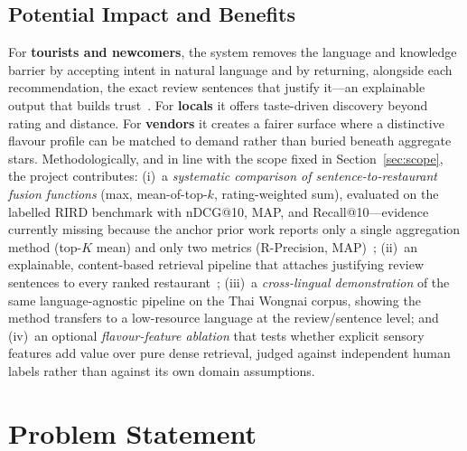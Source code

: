 \documentclass[10pt,twocolumn]{article}
\begin{document}
\subsection{Potential Impact and Benefits}
For \textbf{tourists and newcomers}, the system removes the language and knowledge
barrier by accepting intent in natural language and by returning, alongside each
recommendation, the exact review sentences that justify it---an explainable output that
builds trust~\cite{zhang2020explainable}. For \textbf{locals} it offers taste-driven
discovery beyond rating and distance. For \textbf{vendors} it creates a fairer surface
where a distinctive flavour profile can be matched to demand rather than buried beneath
aggregate stars. Methodologically, and in line with the scope fixed in
Section~\ref{sec:scope}, the project contributes: (i)~a \emph{systematic comparison of
sentence-to-restaurant fusion functions} (max, mean-of-top-$k$, rating-weighted sum),
evaluated on the labelled RIRD benchmark with nDCG@10, MAP, and Recall@10---evidence
currently missing because the anchor prior work reports only a single aggregation
method (top-$K$ mean) and only two metrics (R-Precision, MAP)~\cite{rird2023};
(ii)~an explainable, content-based retrieval pipeline that attaches justifying review
sentences to every ranked restaurant~\cite{zhang2020explainable,kostric2024usage};
(iii)~a \emph{cross-lingual demonstration} of the same language-agnostic pipeline on
the Thai Wongnai corpus, showing the method transfers to a low-resource language at the
review/sentence level; and (iv)~an optional \emph{flavour-feature ablation} that tests
whether explicit sensory features add value over pure dense retrieval, judged against
independent human labels rather than against its own domain assumptions.

\section{Problem Statement}
\end{document}
